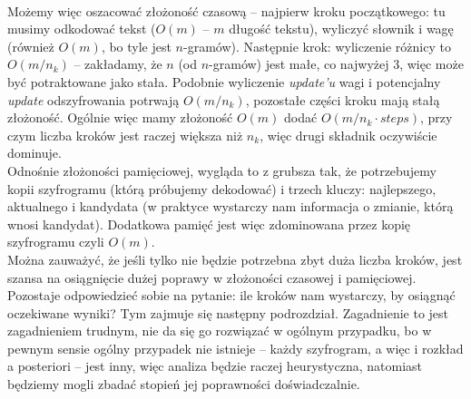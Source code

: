 \documentclass[a4paper]{article}
\theoremstyle{defn}
\theoremstyle{theorem}
\theoremstyle{lemma}
\theoremstyle{cor}
\theoremstyle{fact}
\begin{document}
\\

Możemy więc oszacować złożoność czasową – najpierw kroku początkowego: tu musimy odkodować tekst ($O(m)$ – $m$ długość tekstu), wyliczyć słownik i wagę (również  $O(m)$, bo tyle jest $n$-gramów). Następnie krok: wyliczenie różnicy to $O(m/n_k)$ – zakładamy, że $n$ (od $n$-gramów) jest małe, co najwyżej 3, więc może być potraktowane jako stała. Podobnie wyliczenie \textit{update'u} wagi i potencjalny \textit{update} odszyfrowania potrwają $O(m/n_k)$, pozostałe części kroku mają stałą złożoność. Ogólnie więc mamy złożoność $O(m)$ dodać $O(m/n_k \cdot steps)$, przy czym liczba kroków jest raczej większa niż $n_k$, więc drugi składnik oczywiście dominuje.\\
Odnośnie złożoności pamięciowej, wygląda to z grubsza tak, że potrzebujemy kopii szyfrogramu (którą próbujemy dekodować) i trzech kluczy: najlepszego, aktualnego i kandydata (w praktyce wystarczy nam informacja o zmianie, którą wnosi kandydat). Dodatkowa pamięć jest więc zdominowana przez kopię szyfrogramu czyli $O(m)$.\\

Można zauważyć, że jeśli tylko nie będzie potrzebna zbyt duża liczba kroków, jest szansa na osiągnięcie dużej poprawy w złożoności czasowej i pamięciowej. Pozostaje odpowiedzieć sobie na pytanie: ile kroków nam wystarczy, by osiągnąć oczekiwane wyniki? Tym zajmuje się następny podrozdział. Zagadnienie to jest zagadnieniem trudnym, nie da się go rozwiązać w ogólnym przypadku, bo w pewnym sensie ogólny przypadek nie istnieje – każdy szyfrogram, a więc i rozkład a posteriori – jest inny, więc analiza będzie raczej heurystyczna, natomiast będziemy mogli zbadać stopień jej poprawności doświadczalnie.
\end{document}
